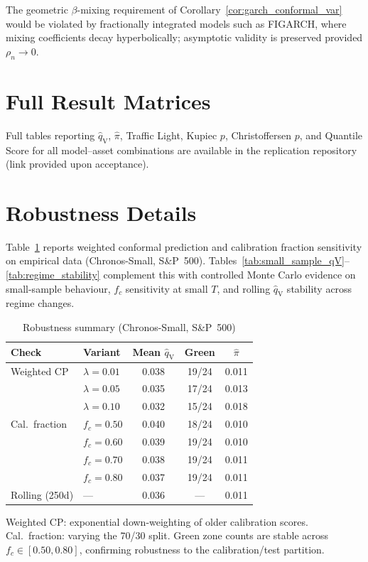 \documentclass[preprint,11pt,authoryear]{elsarticle}
\newcommand{\1}{\boldsymbol{1}}
\newcommand{\qV}{\hat{q}_{\scriptscriptstyle\mathrm{V}}}
\begin{document}
	The geometric $\beta$-mixing requirement of Corollary~\ref{cor:garch_conformal_var} would be violated by fractionally integrated models such as FIGARCH, where mixing coefficients decay hyperbolically; asymptotic validity is preserved provided $\rho_n \to 0$.
	
	
	\section{Full Result Matrices}
	\label{app:full_results}
	
	Full tables reporting $\qV$, $\hat\pi$, Traffic Light, Kupiec $p$, Christoffersen $p$, and Quantile Score for all model--asset combinations are available in the replication repository (link provided upon acceptance).
	
	
	\section{Robustness Details}
	\label{app:robustness}
	
	Table~\ref{tab:robustness} reports weighted conformal prediction
	and calibration fraction sensitivity on empirical data
	(Chronos-Small, S\&P~500). Tables~\ref{tab:small_sample_qV}--\ref{tab:regime_stability}
	complement this with controlled Monte Carlo evidence on
	small-sample behaviour, $f_c$ sensitivity at small $T$, and
	rolling $\qV$ stability across regime changes.
	
	\begin{table}[H]
		\centering
		\caption{Robustness summary (Chronos-Small, S\&P~500)}
		\label{tab:robustness}
		\footnotesize
		\begin{tabular}{@{}llccc@{}}
			\toprule
			Check & Variant & Mean $\qV$ & Green & $\hat\pi$ \\
			\midrule
			Weighted CP     & $\lambda=0.01$  & 0.038 & 19/24 & 0.011 \\
			& $\lambda=0.05$  & 0.035 & 17/24 & 0.013 \\
			& $\lambda=0.10$  & 0.032 & 15/24 & 0.018 \\
			\midrule
			Cal.\ fraction  & $f_c=0.50$      & 0.040 & 18/24 & 0.010 \\
			& $f_c=0.60$      & 0.039 & 19/24 & 0.010 \\
			& $f_c=0.70$      & 0.038 & 19/24 & 0.011 \\
			& $f_c=0.80$      & 0.037 & 19/24 & 0.011 \\
			\midrule
			Rolling (250d)  & ---             & 0.036 & --- & 0.011 \\
			\bottomrule
		\end{tabular}
		\begin{minipage}{\linewidth}\footnotesize
			\smallskip
			Weighted CP: exponential down-weighting of older calibration scores. Cal.\ fraction: varying the 70/30 split. Green zone counts are stable across $f_c \in [0.50, 0.80]$, confirming robustness to the calibration/test partition.
		\end{minipage}
	\end{table}
	
	
	
	
	
	
	
\end{document}
